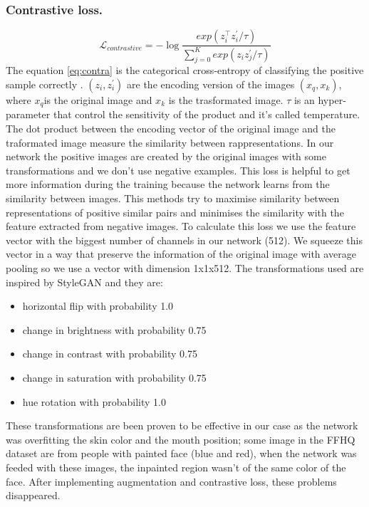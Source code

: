 \documentclass[10pt,twocolumn,letterpaper]{article}
\begin{document}
\subsubsection{Contrastive loss.}
\begin{dmath}\label{eq:contra}
    \mathcal{L}_{contrastive} = - \log{\frac{exp(z_{i}^\intercal z_{i}^{'}/\tau)}{\sum_{j=0}^{K}exp(z_{i}z_{j}^{'}/\tau)}}
\end{dmath}
The equation \eqref{eq:contra} is the categorical cross-entropy of classifying
the positive sample correctly \cite{oord2018representation}. \((z_{i},
z_{i}^{'})\) are the encoding version of the images \((x_{q}, x_{k})\), where
\(x_{q}\)is the original image and \(x_{k}\) is the trasformated image. \(\tau\)
is an hyper-parameter that control the sensitivity of the product and it's
called temperature. The dot product between the encoding vector of the original
image and the traformated image measure the similarity between rappresentations.
In our network the positive images are created by the original images with some
transformations and we don't use negative examples. This loss is helpful to get
more information during the training because the network learns from the
similarity between images. This methods try to maximise similarity between
representations of positive similar pairs and minimises the similarity with the
feature extracted from negative images\cite{le2020contrastive}.
To calculate this loss we use the feature vector with the biggest number of
channels in our network (512). We squeeze this vector in a way that preserve the
information of the original image with average pooling so we use a vector with
dimension 1x1x512. The transformations used are inspired by
StyleGAN\cite{karras2020analyzing} and they are:
\begin{itemize}
  \item horizontal flip with probability 1.0
  \item change in brightness with probability 0.75
  \item change in contrast with probability 0.75
  \item change in saturation with probability 0.75
  \item hue rotation with probability 1.0
\end{itemize}
These transformations are been proven to be effective in our case as the network
was overfitting the skin color and the mouth position; some image in the FFHQ
dataset are from people with painted face (blue and red), when the network was
feeded with these images, the inpainted region wasn't of the same color of the
face. After implementing augmentation and contrastive loss, these problems disappeared.
\end{document}
